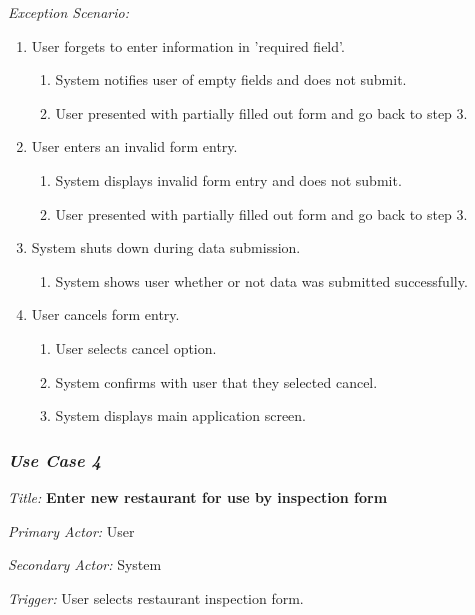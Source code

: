 \documentclass[twoside,letterpaper]{article}
\begin{document}
{\color{black} \textit{Exception Scenario:}}
\begin{enumerate}
\item User forgets to enter information in 'required field'.
\begin{enumerate}
\item System notifies user of empty fields and does not submit.
\item User presented with partially filled out form and go back to step 3.
\end{enumerate}

\item User enters an invalid form entry.
\begin{enumerate}
\item System displays invalid form entry and does not submit.
\item User presented with partially filled out form and go back to step 3.
\end{enumerate}

\item System shuts down during data submission.
\begin{enumerate}
\item System shows user whether or not data was submitted successfully. 
\end{enumerate}

\item User cancels form entry.
\begin{enumerate}
\item User selects cancel option.
\item System confirms with user that they selected cancel.
\item System displays main application screen.
\end{enumerate}
\end{enumerate}


\subsubsection{\textit{Use Case 4}} 

\textit{Title: }{\bfseries\color{black} Enter new restaurant for use by inspection form}

{\color{black} \textit{Primary Actor:} User}

{\color{black} \textit{Secondary Actor:} System}

{\color{black} \textit{Trigger:} User selects restaurant inspection form.}
\end{document}
